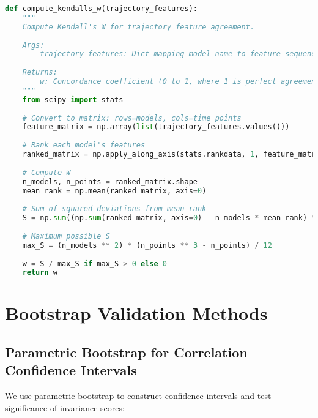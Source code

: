 \documentclass[11pt,letterpaper]{article}
\begin{document}
\begin{lstlisting}[language=Python]
def compute_kendalls_w(trajectory_features):
    """
    Compute Kendall's W for trajectory feature agreement.
    
    Args:
        trajectory_features: Dict mapping model_name to feature sequence
    
    Returns:
        w: Concordance coefficient (0 to 1, where 1 is perfect agreement)
    """
    from scipy import stats
    
    # Convert to matrix: rows=models, cols=time points
    feature_matrix = np.array(list(trajectory_features.values()))
    
    # Rank each model's features
    ranked_matrix = np.apply_along_axis(stats.rankdata, 1, feature_matrix)
    
    # Compute W
    n_models, n_points = ranked_matrix.shape
    mean_rank = np.mean(ranked_matrix, axis=0)
    
    # Sum of squared deviations from mean rank
    S = np.sum((np.sum(ranked_matrix, axis=0) - n_models * mean_rank) ** 2)
    
    # Maximum possible S
    max_S = (n_models ** 2) * (n_points ** 3 - n_points) / 12
    
    w = S / max_S if max_S > 0 else 0
    return w
\end{lstlisting}

\section{Bootstrap Validation Methods}
\label{app:bootstrap}

\subsection{Parametric Bootstrap for Correlation Confidence Intervals}

We use parametric bootstrap to construct confidence intervals and test significance of invariance scores:
\end{document}
